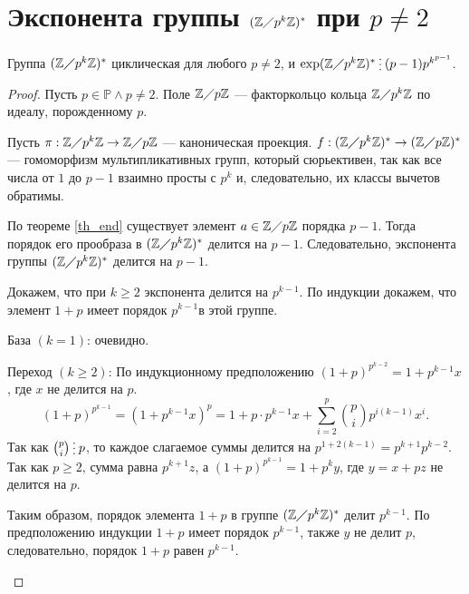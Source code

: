 \documentclass[11pt]{book}
\newcommand{\Z}{\mathbb{Z}}
\newcommand{\Pm}{\mathbb{P}}
\newcommand{\po}{\diagup}
\newcommand{\del}{{\:\small \raisebox{-2pt}{\vdots}\:}}
\renewcommand{\ge}{\geqslant}
\theoremstyle{definition}
\theoremstyle{plain}
\theoremstyle{plain}
\theoremstyle{definition}
\theoremstyle{remark}
\begin{document}
\section{Экспонента группы $ (\Z \po p^{k}\Z)^{*}$ при $ p \ne  2$ }
\begin{thm}
    Группа $ (\Z \po p^{k }\Z)^{*}$ циклическая для любого $ p \ne 2$, и $ \exp (\Z \po p^{k}\Z)^{*} \del (p-1)p^{k^{p-1}}$.
\end{thm}
\begin{proof}
    Пусть $ p \in \Pm \wedge p \ne  2$. Поле $ \Z \po p\Z$ --- факторкольцо кольца  $ \Z \po p^{k }\Z$ по идеалу, порожденному $ p$.

    Пусть  $ \pi: \Z \po p^{k}\Z \to  \Z \po p\Z$ --- каноническая проекция. $f: (\Z \po p^{k}\Z)^{*} \to  (\Z \po p\Z)^{*}$ --- гомоморфизм мультипликативных групп, который сюрьективен, так как все числа от $ 1$ до $p-1 $ взаимно просты с $ p^{k}$ и, следовательно, их классы вычетов обратимы.

    По теореме \ref{th_end} существует элемент $ a \in \Z \po p\Z$ порядка $ p-1$. Тогда порядок его прообраза в  $ (\Z \po p^{k}\Z)^{*}$ делится на $ p-1$. Следовательно, экспонента группы  $ (\Z \po p^{k} \Z)^{*}$ делится на $ p-1$.

    Докажем, что при $ k \ge 2$ экспонента делится на $ p^{k-1}$.
    По индукции докажем, что элемент $ 1+p$ имеет порядок  $ p^{k-1}$в этой группе.
    \begin{description}
	\item База $ (k=1)$: очевидно.
	\item Переход  $ (k \ge 2)$: По индукционному предположению
	    $ (1+p)^{p^{k-2}} = 1 + p^{k-1}x$, где $ x$ не делится на  $ p$.
	    \[
		(1+p)^{p^{k-1}} = (1 + p^{k-1} x)^{p} = 1  + p\cdot p^{k-1}x+ \sum_{i=2}^{p} {{p}\choose{i}} p^{i (k-1)} x^{i}
	    .\]
	    Так как $ {p \choose i} \del p$, то каждое слагаемое суммы делится на  $ p^{1 + 2(k-1)} = p^{k+1}p^{k-2}$.
	    Так как $ p \ge 2$, сумма равна $ p^{k+1}z$, а $ (1+p) ^{p^{k-1}} = 1 + p^{k}y$, где $ y = x + pz$ не делится на  $ p$.

	    Таким образом, порядок элемента  $ 1 + p$ в группе  $ (\Z \po p^{k} \Z)^{*}$  делит $ p^{k-1}$. По предположению индукции $ 1+p $ имеет порядок  $ p^{k-1}$, также $ y $ не делит  $ p$, следовательно, порядок  $ 1+p$ равен  $ p^{k-1}$.
    \end{description}
\end{proof}
\end{document}
